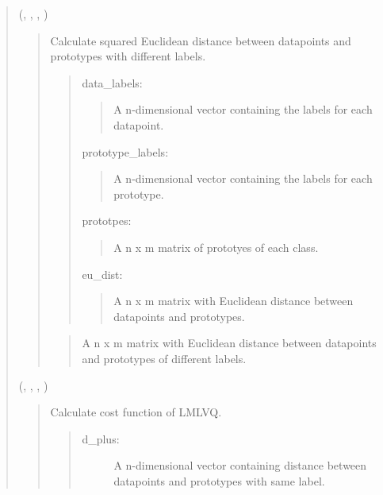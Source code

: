 \documentclass[letterpaper,10pt,english,openany,oneside]{sphinxmanual}
\begin{document}
\begin{quote}
(, , , )
\begin{quote}

Calculate squared Euclidean distance between datapoints and prototypes with different labels.

\begin{quote}

data\_labels:
\begin{quote}

A n-dimensional vector containing the labels for each datapoint.
\end{quote}

prototype\_labels:
\begin{quote}

A n-dimensional vector containing the labels for each prototype.
\end{quote}

prototpes:
\begin{quote}

A n x m matrix of prototyes of each class.
\end{quote}

eu\_dist:
\begin{quote}

A n x m matrix with Euclidean distance between datapoints and prototypes.
\end{quote}
\end{quote}

\begin{quote}

A n x m matrix with Euclidean distance between datapoints and prototypes of different labels.
\end{quote}
\end{quote}

(, , , )
\begin{quote}

Calculate cost function of LMLVQ.

\begin{quote}
\begin{description}
\item[{d\_plus:}] \leavevmode
A n-dimensional vector containing distance between datapoints and prototypes with same label.


\end{description}
\end{quote}
\end{quote}
\end{quote}
\end{document}
